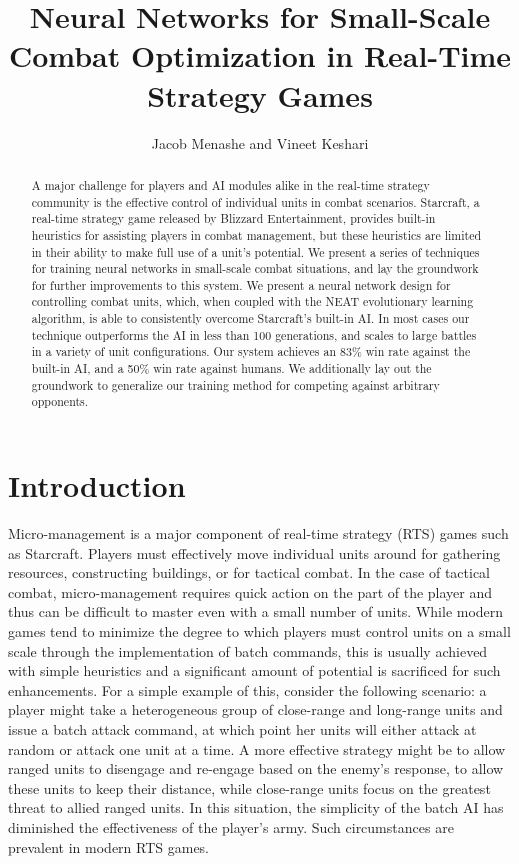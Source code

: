 \documentclass[10pt,a4paper,twocolumn]{article}
\begin{document}
\title{Neural Networks for Small-Scale Combat Optimization in Real-Time Strategy Games}
\author{Jacob Menashe and Vineet Keshari}
\maketitle

\begin{abstract}
A major challenge for players and AI modules alike in the real-time strategy community is the effective control of individual units in combat scenarios. Starcraft, a real-time strategy game released by Blizzard Entertainment, provides built-in heuristics for assisting players in combat management, but these heuristics are limited in their ability to make full use of a unit's potential. We present a series of techniques for training neural networks in small-scale combat situations, and lay the groundwork for further improvements to this system. We present a neural network design for controlling combat units, which, when coupled with the NEAT evolutionary learning algorithm, is able to consistently overcome Starcraft's built-in AI. In most cases our technique outperforms the AI in less than 100 generations, and scales to large battles in a variety of unit configurations. Our system achieves an 83\% win rate against the built-in AI, and a 50\% win rate against humans. We additionally lay out the groundwork to generalize our training method for competing against arbitrary opponents.
\end{abstract}

\section{Introduction}

Micro-management is a major component of real-time strategy (RTS) games such as Starcraft. Players must effectively move individual units around for gathering resources, constructing buildings, or for tactical combat. In the case of tactical combat, micro-management requires quick action on the part of the player and thus can be difficult to master even with a small number of units. While modern games tend to minimize the degree to which players must control units on a small scale through the implementation of batch commands, this is usually achieved with simple heuristics and a significant amount of potential is sacrificed for such enhancements. For a simple example of this, consider the following scenario: a player might take a heterogeneous group of close-range and long-range units and issue a batch attack command, at which point her units will either attack at random or attack one unit at a time. A more effective strategy might be to allow ranged units to disengage and re-engage based on the enemy's response, to allow these units to keep their distance, while close-range units focus on the greatest threat to allied ranged units. In this situation, the simplicity of the batch AI has diminished the effectiveness of the player's army. Such circumstances are prevalent in modern RTS games.
\end{document}
